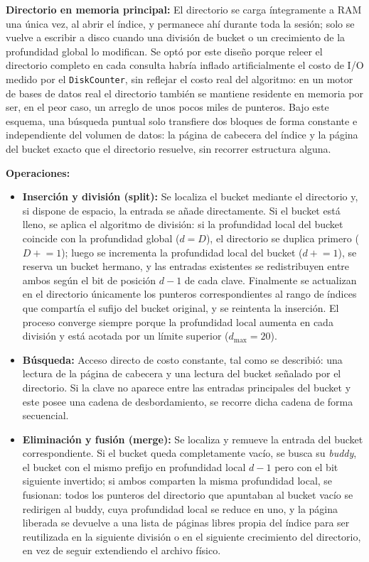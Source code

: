 \documentclass[a4paper,12pt]{article}
\begin{document}
\textbf{Directorio en memoria principal:} El directorio se carga íntegramente a
RAM una única vez, al abrir el índice, y permanece ahí durante toda la sesión;
solo se vuelve a escribir a disco cuando una división de bucket o un crecimiento
de la profundidad global lo modifican. Se optó por este diseño porque releer el
directorio completo en cada consulta habría inflado artificialmente el costo de
I/O medido por el \texttt{DiskCounter}, sin reflejar el costo real del
algoritmo: en un motor de bases de datos real el directorio también se mantiene
residente en memoria por ser, en el peor caso, un arreglo de unos pocos miles de
punteros. Bajo este esquema, una búsqueda puntual solo transfiere dos bloques de
forma constante e independiente del volumen de datos: la página de cabecera del
índice y la página del bucket exacto que el directorio resuelve, sin recorrer
estructura alguna.

\textbf{Operaciones:}
\begin{itemize}
    \item \textbf{Inserción y división (split):} Se localiza el bucket mediante
    el directorio y, si dispone de espacio, la entrada se añade directamente. Si
    el bucket está lleno, se aplica el algoritmo de división: si la profundidad
    local del bucket coincide con la profundidad global ($d = D$), el
    directorio se duplica primero ($D \mathrel{+}= 1$); luego se incrementa la
    profundidad local del bucket ($d \mathrel{+}= 1$), se reserva un bucket
    hermano, y las entradas existentes se redistribuyen entre ambos según el bit
    de posición $d-1$ de cada clave. Finalmente se actualizan en el directorio
    únicamente los punteros correspondientes al rango de índices que compartía
    el sufijo del bucket original, y se reintenta la inserción. El proceso
    converge siempre porque la profundidad local aumenta en cada división y está
    acotada por un límite superior ($d_{\max} = 20$).
    \item \textbf{Búsqueda:} Acceso directo de costo constante, tal como se
    describió: una lectura de la página de cabecera y una lectura del bucket
    señalado por el directorio. Si la clave no aparece entre las entradas
    principales del bucket y este posee una cadena de desbordamiento, se
    recorre dicha cadena de forma secuencial.
    \item \textbf{Eliminación y fusión (merge):} Se localiza y remueve la
    entrada del bucket correspondiente. Si el bucket queda completamente vacío,
    se busca su \textit{buddy}, el bucket con el mismo prefijo en profundidad
    local $d-1$ pero con el bit siguiente invertido; si ambos comparten la
    misma profundidad local, se fusionan: todos los punteros del directorio que
    apuntaban al bucket vacío se redirigen al buddy, cuya profundidad local se
    reduce en uno, y la página liberada se devuelve a una lista de páginas
    libres propia del índice para ser reutilizada en la siguiente división o en
    el siguiente crecimiento del directorio, en vez de seguir extendiendo el
    archivo físico.
\end{itemize}
\end{document}
